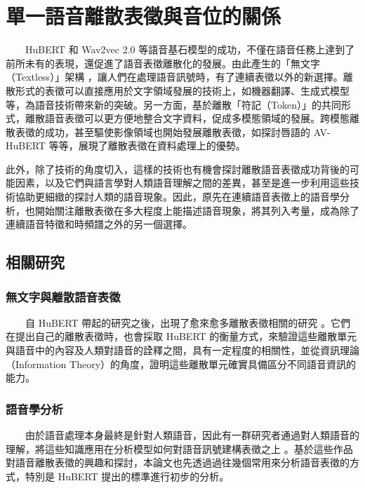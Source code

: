 
\chapter{單一語音離散表徵與音位的關係}

　　HuBERT \cite{hsu_hubert_2021, hsu_hubert_2021-2} 和 Wav2vec 2.0 \cite{baevski2020wav2vec} 等語音基石模型的成功，不僅在語音任務上達到了前所未有的表現，還促進了語音表徵離散化的發展。由此產生的「無文字（Textless）」架構 \cite{noauthor_textless_2021, lakhotia_generative_2021, lakhotia_generative_2021-1}，讓人們在處理語音訊號時，有了連續表徵以外的新選擇。離散形式的表徵可以直接應用於文字領域發展的技術上，如機器翻譯、生成式模型等，為語音技術帶來新的突破。另一方面，基於離散「符記（Token）」的共同形式，離散語音表徵可以更方便地整合文字資料，促成多模態領域的發展。跨模態離散表徵的成功，甚至驅使影像領域也開始發展離散表徵，如探討唇語的 AV-HuBERT \cite{shi2021learning} 等等，展現了離散表徵在資料處理上的優勢。

        此外，除了技術的角度切入，這樣的技術也有機會探討離散語音表徵成功背後的可能因素，以及它們與語言學對人類語音理解之間的差異，甚至是進一步利用這些技術協助更細緻的探討人類的語音現象。因此，原先在連續語音表徵上的語音學分析，也開始關注離散表徵在多大程度上能描述語音現象，將其列入考量，成為除了連續語音特徵和時頻譜之外的另一個選擇。

\section{相關研究}          %

\subsection{無文字與離散語音表徵}

　　自 HuBERT 帶起的研究之後，出現了愈來愈多離散表徵相關的研究\cite{10097097, abdullah23_interspeech, chang_exploration_2023, liu2024dinosr, zhang2024speechtokenizer, huang2023repcodec} 。它們在提出自己的離散表徵時，也會採取 HuBERT 的衡量方式，來驗證這些離散單元與語音中的內容及人類對語音的詮釋之間，具有一定程度的相關性，並從資訊理論（Information Theory）的角度，證明這些離散單元確實具備區分不同語音資訊的能力。

\subsection{語音學分析}

　　由於語音處理本身最終是針對人類語音，因此有一群研究者通過對人類語音的理解，將這些知識應用在分析模型如何對語音訊號建構表徵之上\cite{deseyssel22_interspeech, wells_phonetic_2022, 10097097, abdullah23_interspeech} 。基於這些作品對語音離散表徵的興趣和探討，本論文也先透過過往幾個常用來分析語音表徵的方式，特別是 HuBERT \cite{hsu_hubert_2021-2} 提出的標準進行初步的分析。


